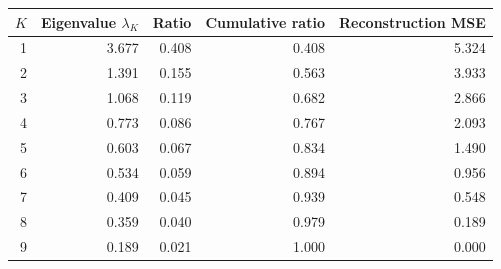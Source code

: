\documentclass[11pt,a4paper]{article}
\begin{document}
\begin{center}
\small
\begin{tabular}{rrrrr}
\toprule
$K$ & Eigenvalue $\lambda_K$ & Ratio & Cumulative ratio & Reconstruction MSE\\
\midrule
1 & 3.677 & 0.408 & 0.408 & 5.324\\
2 & 1.391 & 0.155 & 0.563 & 3.933\\
3 & 1.068 & 0.119 & 0.682 & 2.866\\
4 & 0.773 & 0.086 & 0.767 & 2.093\\
5 & 0.603 & 0.067 & 0.834 & 1.490\\
6 & 0.534 & 0.059 & 0.894 & 0.956\\
7 & 0.409 & 0.045 & 0.939 & 0.548\\
8 & 0.359 & 0.040 & 0.979 & 0.189\\
9 & 0.189 & 0.021 & 1.000 & 0.000\\
\bottomrule
\end{tabular}
\end{center}
\end{document}

